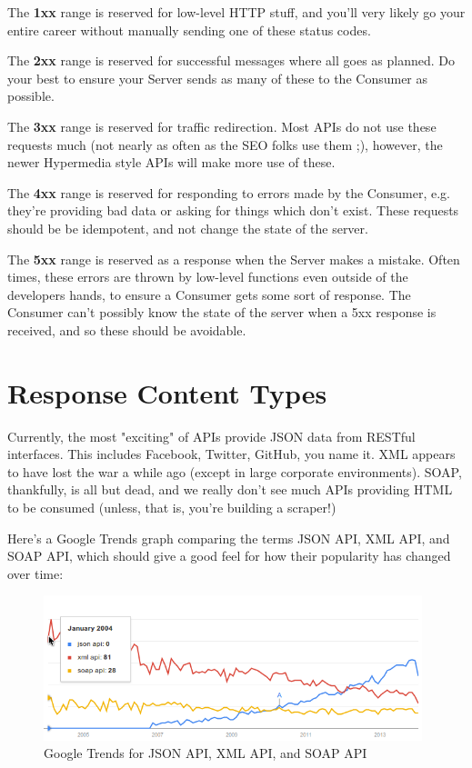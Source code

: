 \documentclass{book}
\begin{document}
The \textbf{1xx} range is reserved for low-level HTTP stuff, and you'll very likely go your entire career without manually sending one of these status codes.

The \textbf{2xx} range is reserved for successful messages where all goes as planned. Do your best to ensure your Server sends as many of these to the Consumer as possible.

The \textbf{3xx} range is reserved for traffic redirection. Most APIs do not use these requests much (not nearly as often as the SEO folks use them ;), however, the newer Hypermedia style APIs will make more use of these.

The \textbf{4xx} range is reserved for responding to errors made by the Consumer, e.g. they're providing bad data or asking for things which don't exist. These requests should be be idempotent, and not change the state of the server.

The \textbf{5xx} range is reserved as a response when the Server makes a mistake. Often times, these errors are thrown by low-level functions even outside of the developers hands, to ensure a Consumer gets some sort of response. The Consumer can't possibly know the state of the server when a 5xx response is received, and so these should be avoidable.


\chapter{Response Content Types}

Currently, the most "exciting" of APIs provide JSON data from RESTful interfaces. This includes Facebook, Twitter, GitHub, you name it. XML appears to have lost the war a while ago (except in large corporate environments). SOAP, thankfully, is all but dead, and we really don't see much APIs providing HTML to be consumed (unless, that is, you're building a scraper!)

Here's a Google Trends graph comparing the terms JSON API, XML API, and SOAP API, which should give a good feel for how their popularity has changed over time:

\begin{figure}[ht!]
\centering
\includegraphics[width=110mm]{images/xml-vs-json-vs-soap-google-trends.png}
\caption{Google Trends for JSON API, XML API, and SOAP API}
\label{overflow}
\end{figure}
\end{document}
